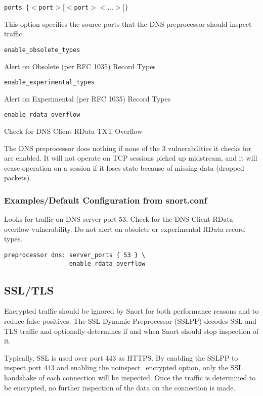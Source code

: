 \documentclass[english]{report}
\newcounter{slistnum}
\newenvironment{slist}
{ \begin{list}{ {\bf \arabic{slistnum}.} }{\usecounter{slistnum} } }
{ \end{list} }
\begin{document}
\begin{slist}

\item \texttt{ports $\{ <$port$> [<$port$> <...>] \}$}

This option specifies the source ports that the DNS preprocessor should
inspect traffic.

\item \texttt{enable\_obsolete\_types}

Alert on Obsolete (per RFC 1035) Record Types

\item \texttt{enable\_experimental\_types}

Alert on Experimental (per RFC 1035) Record Types

\item \texttt{enable\_rdata\_overflow}

Check for DNS Client RData TXT Overflow

\end{slist}

The DNS preprocessor does nothing if none of the 3 vulnerabilities
it checks for are enabled.  It will not operate on TCP sessions
picked up midstream, and it will cease operation on a session if it
loses state because of missing data (dropped packets).

\subsubsection{Examples/Default Configuration from snort.conf}

Looks for traffic on DNS server port 53.  Check for the DNS Client RData
overflow vulnerability.  Do not alert on obsolete or experimental RData
record types.

\begin{verbatim}
preprocessor dns: server_ports { 53 } \
                  enable_rdata_overflow
\end{verbatim}

\subsection{SSL/TLS\label{sub:SSL/TLS}}

Encrypted traffic should be ignored by Snort for both performance reasons and
to reduce false positives.  The SSL Dynamic Preprocessor (SSLPP) decodes 
SSL and TLS traffic and optionally determines if and when Snort should stop 
inspection of it.

Typically, SSL is used over port 443 as HTTPS.  By enabling the SSLPP to
inspect port 443 and enabling the noinspect\_encrypted option, only the SSL 
handshake of each connection will be inspected.  Once the traffic is 
determined to be encrypted, no further inspection of the data on the connection
is made.
\end{document}
